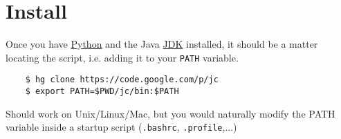 
\section{ Install }

Once you have  \href{http://python.org}{Python} and the Java
 \href{http:openjdk.java.net}{JDK} installed, it should be a matter
locating the script, i.e. adding it to your \texttt{PATH} variable.


{\small
\begin{verbatim}
    $ hg clone https://code.google.com/p/jc
    $ export PATH=$PWD/jc/bin:$PATH
\end{verbatim}
}


Should work on Unix/Linux/Mac, but you would naturally modify
the PATH variable inside a startup script (\texttt{.bashrc}, \texttt{.profile},...)



